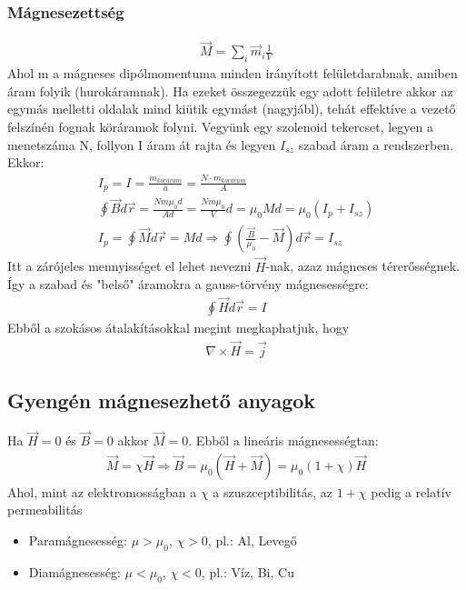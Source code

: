 \documentclass{article}
\begin{document}
\subsubsection{Mágnesezettség}
\begin{gather*}
\vec{M} = \sum_i \vec{m}_i \frac{1}{V}
\end{gather*}
Ahol m a mágneses dipólmomentuma minden irányított felületdarabnak, amiben áram folyik (hurokáramnak). Ha ezeket összegezzük egy adott felületre akkor az egymás melletti oldalak mind kiütik egymást (nagyjábl), tehát effektíve a vezető felszínén fognak köráramok folyni. Vegyünk egy szolenoid tekercset, legyen a menetszáma N, follyon I áram át rajta és legyen $I_{sz}$ szabad áram a rendszerben. Ekkor:
\begin{gather*}
I_p = I = \frac{m_{koraram}}{a} = \frac{N \cdot m_{koraram}}{A} \\
\oint \vec{B} d\vec{r} = \frac{Nm \mu_0 d}{A d} = \frac{Nm \mu_0}{V} d = \mu_0 M d  = \mu_0 (I_p + I_{sz}) \\
I_p = \oint \vec{M} d\vec{r} = Md \Rightarrow \oint \left( \frac{\vec{B}}{\mu_0}-\vec{M} \right) d\vec{r} = I_{sz}
\end{gather*}
Itt a zárójeles mennyisséget el lehet nevezni $\vec{H}$-nak, azaz mágneses térerősségnek. Így a szabad és "belső" áramokra a gauss-törvény mágnesességre:
\begin{gather*}
\oint \vec{H} d\vec{r} = I
\end{gather*} Ebből a szokásos átalakításokkal megint megkaphatjuk, hogy
\begin{gather*}
\nabla  \times \vec{H} = \vec{j}
\end{gather*}
\subsection{Gyengén mágnesezhető anyagok}
Ha $\vec{H}=0$ és $\vec{B}=0$ akkor $\vec{M}=0$. Ebből a lineáris mágnesességtan:
\begin{gather*}
\vec{M} = \chi \vec{H} \Rightarrow \vec{B} = \mu_0(\vec{H} + \vec{M}) = \mu_0 (1+\chi) \vec{H}
\end{gather*}
Ahol, mint az elektromosságban a $\chi$ a szuszceptibilitás, az $1+\chi$ pedig a relatív permeabilitás
\begin{itemize}
\item Paramágnesesség: $\mu>\mu_0$, $\chi>0$, pl.: Al, Levegő 
\item Diamágnesesség: $\mu<\mu_0$, $\chi<0$, pl.: Víz, Bi, Cu
\end{itemize}
\end{document}
